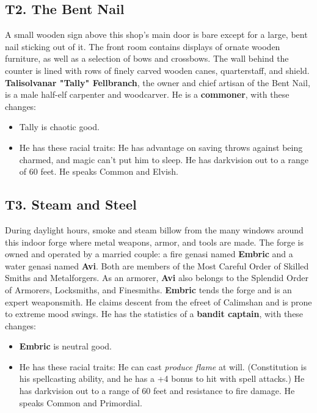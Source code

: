 \documentclass[10pt,a4paper,twoside,twocolumn,openany,nodeprecatedcode]{dndbook}
\begin{document}
\subsection{T2. The Bent Nail}
A small wooden sign above this shop's main door is bare except for a large, bent nail sticking out of it. The front room contains displays of ornate wooden furniture, as well as a selection of bows and crossbows. The wall behind the counter is lined with rows of finely carved wooden canes, quarterstaff, and shield.
\textbf{Talisolvanar "Tally" Fellbranch}, the owner and chief artisan of the Bent Nail, is a male half-elf carpenter and woodcarver. He is a \textbf{commoner}, with these changes:
\begin{itemize}

\item Tally is chaotic good.
\item He has these racial traits: He has advantage on saving throws against being charmed, and magic can't put him to sleep. He has darkvision out to a range of 60 feet. He speaks Common and Elvish.
\end{itemize}


\subsection{T3. Steam and Steel}
During daylight hours, smoke and steam billow from the many windows around this indoor forge where metal weapons, armor, and tools are made. The forge is owned and operated by a married couple: a fire genasi named \textbf{Embric} and a water genasi named \textbf{Avi}. Both are members of the Most Careful Order of Skilled Smiths and Metalforgers. As an armorer, \textbf{Avi} also belongs to the Splendid Order of Armorers, Locksmiths, and Finesmiths.
\textbf{Embric} tends the forge and is an expert weaponsmith. He claims descent from the efreet of Calimshan and is prone to extreme mood swings. He has the statistics of a \textbf{bandit captain}, with these changes:
\begin{itemize}

\item \textbf{Embric} is neutral good.
\item He has these racial traits: He can cast \textit{produce flame} at will. (Constitution is his spellcasting ability, and he has a +4 bonus to hit with spell attacks.) He has darkvision out to a range of 60 feet and resistance to fire damage. He speaks Common and Primordial.
\end{itemize}
\end{document}
